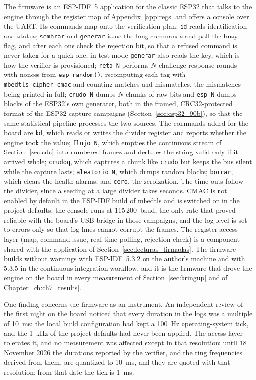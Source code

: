 The firmware is an ESP-IDF~5 application for the classic ESP32 that
talks to the engine through the register map of Appendix~\ref{app:regs}
and offers a console over the UART. Its commands map onto the
verification plan: \texttt{id} reads identification and status;
\texttt{sembrar} and \texttt{generar} issue the long commands and poll
the busy flag, and after each one check the rejection bit, so that a
refused command is never taken for a quick one; in test mode
\texttt{generar} also reads the key, which is how the verifier is
provisioned; \texttt{reto N} performs $N$ challenge-response rounds
with nonces from \texttt{esp\_random()}, recomputing each tag with
\texttt{mbedtls\_cipher\_cmac} and counting matches and mismatches, the
mismatches being printed in full; \texttt{crudo N} dumps $N$ chunks of
raw bits and \texttt{esp N} dumps blocks of the ESP32's own generator, both
in the framed, CRC32-protected format of the ESP32 capture campaigns
(Section~\ref{sec:esp32_90b}), so that the same statistical pipeline
processes the two sources. The commands added for the board are
\texttt{kd}, which reads or writes the divider register and reports
whether the engine took the value; \texttt{flujo N}, which empties the
continuous stream of Section~\ref{sec:cdc} into numbered frames and
declares the string valid only if it arrived whole; \texttt{crudoq},
which captures a chunk like \texttt{crudo} but keeps the bus silent while
the capture lasts; \texttt{aleatorio N}, which dumps random blocks;
\texttt{borrar}, which clears the health alarms; and \texttt{cero}, the
zeroization. The time-outs follow the divider, since a seeding at a
large divider takes seconds. CMAC is
not enabled by default in the ESP-IDF build of mbedtls and is switched on
in the project defaults; the console runs at 115\,200~baud, the only rate
that proved reliable with the board's USB bridge in those campaigns,
and the log level is set to errors only so that log lines cannot corrupt
the frames. The register access layer (map, command issue, real-time
polling, rejection check) is a component shared with the application of
Section~\ref{sec:lecturas_firmadas}. The firmware builds without
warnings with ESP-IDF~5.3.2 on the author's machine and with 5.3.5 in the
continuous-integration workflow, and it is the firmware that drove the
engine on the board in every measurement of Section~\ref{sec:bringup} and
of Chapter~\ref{ch:ch7_results}.

One finding concerns the firmware as an instrument. An independent review
of the first night on the board noticed that every duration in the logs
was a multiple of 10~ms: the local build configuration had kept a 100~Hz
operating-system tick, and the 1~kHz of the project defaults had never
been applied. The access layer tolerates it, and no measurement was
affected except in that resolution: until 18 November 2026 the durations
reported by the verifier, and the ring frequencies derived from them,
are quantized to 10~ms, and they are quoted with that resolution; from
that date the tick is 1~ms.

